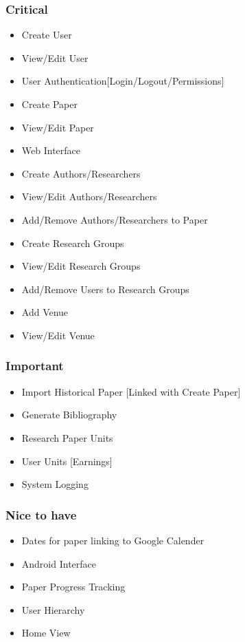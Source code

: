 \documentclass[a4paper,10pt]{article}
\begin{document}
\subsubsection{Critical}
	\begin{itemize}
	  	\item Create User
		\item View/Edit User
		\item User Authentication[Login/Logout/Permissions]
		\item Create Paper
		\item View/Edit Paper
		\item Web Interface
		\item Create Authors/Researchers
		\item View/Edit Authors/Researchers
		\item Add/Remove Authors/Researchers to Paper
		\item Create Research Groups
		\item View/Edit Research Groups
		\item Add/Remove Users to Research Groups
		\item Add Venue
		\item View/Edit Venue
	\end{itemize}

\subsubsection{Important}
	\begin{itemize}
	  	\item Import Historical Paper [Linked with Create Paper]
		\item Generate Bibliography
		\item Research Paper Units
		\item User Units [Earnings]
		\item System Logging 
	\end{itemize}


\subsubsection{Nice to have}
	\begin{itemize}
		\item Dates for paper linking to Google Calender
		\item Android Interface
		\item Paper Progress Tracking
		\item User Hierarchy
		\item Home View
	\end{itemize}
\end{document}
